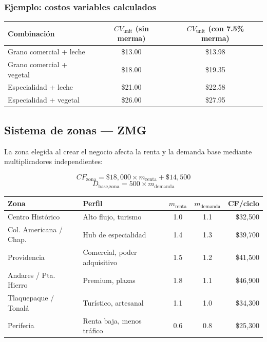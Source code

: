 \documentclass[12pt, a4paper]{article}
\begin{document}
\subsubsection{Ejemplo: costos variables calculados}

\begin{center}
\begin{tabular}{lcc}
  \toprule
  Combinación & $CV_{\text{unit}}$ (sin merma) & $CV_{\text{unit}}$ (con 7.5\% merma) \\
  \midrule
  Grano comercial + leche   & \$13.00 & \$13.98 \\
  Grano comercial + vegetal & \$18.00 & \$19.35 \\
  Especialidad + leche      & \$21.00 & \$22.58 \\
  Especialidad + vegetal    & \$26.00 & \$27.95 \\
  \bottomrule
\end{tabular}
\end{center}

\subsection{Sistema de zonas — ZMG}

La zona elegida al crear el negocio afecta la renta y la demanda base
mediante multiplicadores independientes:

\begin{equation}
  CF_{\text{zona}} = \$18{,}000 \times m_{\text{renta}} + \$14{,}500
\end{equation}
\begin{equation}
  D_{\text{base,zona}} = 500 \times m_{\text{demanda}}
\end{equation}

\begin{center}
\begin{tabular}{llccr}
  \toprule
  \textbf{Zona} & \textbf{Perfil} & $m_{\text{renta}}$ & $m_{\text{demanda}}$ & \textbf{CF/ciclo} \\
  \midrule
  Centro Histórico      & Alto flujo, turismo          & 1.0 & 1.1 & \$32{,}500 \\
  Col. Americana / Chap.& Hub de especialidad          & 1.4 & 1.3 & \$39{,}700 \\
  Providencia           & Comercial, poder adquisitivo & 1.5 & 1.2 & \$41{,}500 \\
  Andares / Pta. Hierro & Premium, plazas              & 1.8 & 1.1 & \$46{,}900 \\
  Tlaquepaque / Tonalá  & Turístico, artesanal         & 1.1 & 1.0 & \$34{,}300 \\
  Periferia             & Renta baja, menos tráfico    & 0.6 & 0.8 & \$25{,}300 \\
  \bottomrule
\end{tabular}
\end{center}
\end{document}
